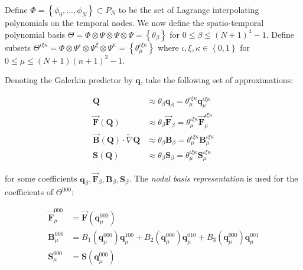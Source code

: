 \documentclass[twoside,english,final,5p,times,twocolumn]{elsarticle}
\begin{document}
Define $\Phi=\left\{ \phi_{0},...,\phi_{N}\right\} \subset P_{N}$
to be the set of Lagrange interpolating polynomials on the temporal
nodes. We now define the spatio-temporal polynomial basis $\Theta=\Phi\otimes\Psi\otimes\Psi\otimes\Psi=\left\{ \theta_{\beta}\right\} $
for $0\leq\beta\leq\left(N+1\right)^{4}-1$. Define subsets $\Theta^{\iota\xi\kappa}=\Phi\otimes\Psi^{\iota}\otimes\Psi^{\xi}\otimes\Psi^{\kappa}=\left\{ \theta_{\mu}^{\iota\xi\kappa}\right\} $
where $\iota,\xi,\kappa\in\left\{ 0,1\right\} $ for $0\leq\mu\leq\left(N+1\right)\left(n+1\right)^{3}-1$.

Denoting the Galerkin predictor by $\boldsymbol{q}$, take the following
set of approximations:

\begin{subequations}

\begin{align}
\boldsymbol{Q} & \approx\theta_{\beta}\boldsymbol{q}_{\beta}=\theta_{\mu}^{\iota\xi\kappa}\boldsymbol{q}_{\mu}^{\iota\xi\kappa}\\
\overrightarrow{\boldsymbol{F}}\left(\boldsymbol{Q}\right) & \approx\theta_{\beta}\overrightarrow{\boldsymbol{F}}_{\beta}=\theta_{\mu}^{\iota\xi\kappa}\overrightarrow{\boldsymbol{F}}_{\mu}^{\iota\xi\kappa}\label{eq:F representation}\\
\overrightarrow{\boldsymbol{B}}\left(\boldsymbol{Q}\right)\cdot\tilde{\nabla}\boldsymbol{Q} & \approx\theta_{\beta}\boldsymbol{B}_{\beta}=\theta_{\mu}^{\iota\xi\kappa}\boldsymbol{B}_{\mu}^{\iota\xi\kappa}\label{eq:B representation}\\
\boldsymbol{S}\left(\boldsymbol{Q}\right) & \approx\theta_{\beta}\boldsymbol{S}_{\beta}=\theta_{\mu}^{\iota\xi\kappa}\boldsymbol{S}_{\mu}^{\iota\xi\kappa}\label{eq:S representation}
\end{align}

\end{subequations}

for some coefficients $\boldsymbol{q}_{\beta},\overrightarrow{\boldsymbol{F}}_{\beta},\boldsymbol{B}_{\beta},\boldsymbol{S}_{\beta}$.
The \textit{nodal basis representation} is used for the coefficients
of $\Theta^{000}$:

\begin{subequations}

\begin{align}
\overrightarrow{\boldsymbol{F}}_{\mu}^{000} & =\overrightarrow{\boldsymbol{F}}\left(\boldsymbol{q}_{\mu}^{000}\right)\\
\boldsymbol{B}_{\mu}^{000} & =B_{1}\left(\boldsymbol{q}_{\mu}^{000}\right)\boldsymbol{q}_{\mu}^{100}+B_{2}\left(\boldsymbol{q}_{\mu}^{000}\right)\boldsymbol{q}_{\mu}^{010}+B_{3}\left(\boldsymbol{q}_{\mu}^{000}\right)\boldsymbol{q}_{\mu}^{001}\\
\boldsymbol{S}_{\mu}^{000} & =\boldsymbol{S}\left(\boldsymbol{q}_{\mu}^{000}\right)
\end{align}

\end{subequations}
\end{document}
